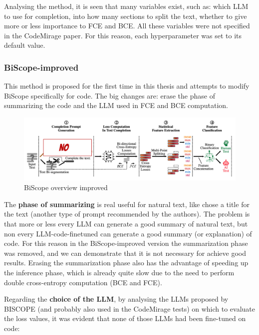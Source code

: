 Analysing the method, it is seen that many variables exist, such as: 
which LLM to use for completion, into how many sections to split 
the text, whether to give more or less importance to FCE and BCE. 
All these variables were not specified in the CodeMirage paper. 
For this reason, each hyperparameter was set to its default value.

\subsubsection{BiScope-improved}
This method is proposed for the first time in this thesis and attempts to modify BiScope specifically for code.
The big changes are: erase the phase of summarizing the code and the LLM used
in FCE and BCE computation.

\begin{figure}[H]
    \centering
    \includegraphics[width=1\textwidth]{img/BiScope/overview improved.jpg}
    \caption{BiScope overview improved}
    \label{fig:BiScope-overview-improved}
\end{figure}

The \textbf{phase of summarizing} is real useful for natural text, like chose
a title for the text (another type of prompt recommended by the authors).
The problem is that more or less every LLM can generate a good summary of
natural text, but non every LLM-code-finetuned can generate a good summary 
(or explanation) of code.
For this reason in the BiScope-improved version the summarization 
phase was removed, and we can demonstrate that it is not necessary for
achieve good results.
Erasing the summarization phase also has the advantage of speeding up
the inference phase, which is already quite slow due to the need to
perform double cross-entropy computation (BCE and FCE).

Regarding the \textbf{choice of the LLM}, 
by analysing the LLMs proposed by BISCOPE (and probably also used in the 
CodeMirage tests) on which to evaluate the loss values, it was evident 
that none of those LLMs had been fine-tuned on code:

